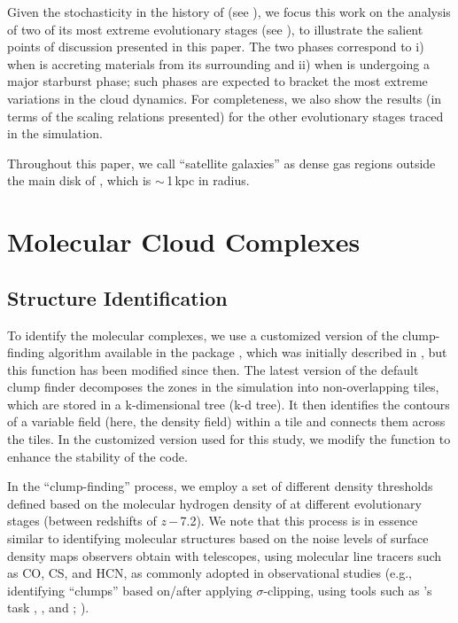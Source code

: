 \IfFileExists{emulateapjlegacy.cls}{\documentclass[iop]{emulateapjlegacy}}{\documentclass[iop]{emulateapj}}
\begin{document}
Given the stochasticity in the \SF history of \flower (see ), we focus this work on the analysis of two of its most extreme evolutionary
stages (see ), to illustrate the salient points of discussion presented in this paper.
The two phases correspond to i) when \flower
is accreting materials from its surrounding  and ii) when \flower is undergoing a major starburst phase; such phases are expected to bracket the most extreme variations in the cloud dynamics.
For completeness, we also show the results (in terms of the scaling relations presented) for
the other evolutionary stages traced in the simulation.

Throughout this paper, we call ``satellite galaxies'' as dense gas regions outside the main disk of \flower,
which is $\sim$\,1\,kpc in radius.

\section{Molecular Cloud Complexes}\label{sec:eqn}

\subsection{Structure Identification}\label{sec:method}

To identify the molecular complexes, we use a customized version of the clump-finding algorithm available in the  package  \citep{Turk11a}, which was initially described in \citet{Smith09a}, but this function has been modified since then.
%
The latest version of the default  clump finder decomposes the zones in the simulation into non-overlapping tiles, which are stored in a k-dimensional tree (k-d tree). It then identifies the contours of a variable field (here, the density field) within a tile and connects them across the tiles. In the customized version used for this study, we modify the function to enhance the stability of the code.

In the ``clump-finding'' process, we employ a set of different density thresholds defined based on the molecular hydrogen density of \flower
at different evolutionary stages (between redshifts of $z$\,$-$\,7.2). We
note that this process is in essence similar to identifying molecular structures based on the noise levels of surface density maps observers obtain with telescopes, using molecular line tracers such as CO, CS, and HCN, as commonly adopted in observational studies (e.g., identifying ``clumps'' based on/after applying $\sigma$-clipping, using tools such as 's task , , and ; \citealt{Williams94a, Oka01a, Rosolowsky06a, Rosolowsky08a}).
\end{document}
